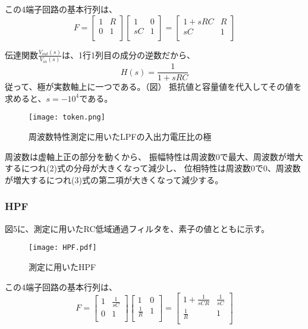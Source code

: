 \documentclass[10pt,a4j,dvipdfmx]{jsarticle}
\begin{document}
この4端子回路の基本行列は、
\begin{equation}
F =
\left[
\begin{array}{rr}
1 & R \\
0 & 1 \\
\end{array}
\right]
\left[
\begin{array}{rr}
1 & 0 \\
sC & 1 \\
\end{array}
\right]
=
\left[
\begin{array}{rr}
1+sRC & R \\
sC & 1 \\
\end{array}
\right]
\end{equation}

伝達関数$\frac{V_{out}\left(s\right)}{V_{in}\left(s\right)}$は、1行1列目の成分の逆数だから、
\begin{equation}
H\left(s\right) = \frac{1}{1+sRC}
\end{equation}
従って、極が実数軸上に一つである。（図）
抵抗値と容量値を代入してその値を求めると、$s = -10^4$である。
\begin{figure}[H]
  \centering
  \texttt{[image: token.png]}
  \caption{周波数特性測定に用いたLPFの入出力電圧比の極}
\end{figure}

周波数は虚軸上正の部分を動くから、
振幅特性は周波数0で最大、周波数が増大するにつれ(2)式の分母が大きくなって減少し、
位相特性は周波数0で0、周波数が増大するにつれ(3)式の第二項が大きくなって減少する。

\subsubsection{HPF}
図5に、測定に用いたRC低域通過フィルタを、素子の値とともに示す。
\begin{figure}[H]
  \centering
  \texttt{[image: HPF.pdf]}
  \caption{測定に用いたHPF}
\end{figure}

この4端子回路の基本行列は、
\begin{equation}
F =
\left[
\begin{array}{rr}
1 & \frac{1}{sC} \\
0 & 1 \\
\end{array}
\right]
\left[
\begin{array}{rr}
1 & 0 \\
\frac{1}{R} & 1 \\
\end{array}
\right]
=
\left[
\begin{array}{rr}
1+\frac{1}{sCR} & \frac{1}{sC} \\
\frac{1}{R} & 1 \\
\end{array}
\right]
\end{equation}
\end{document}
